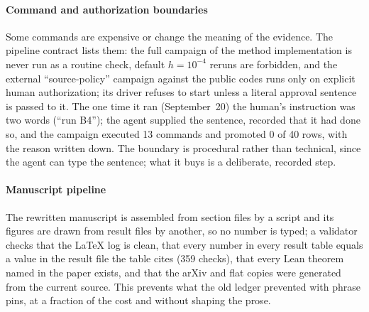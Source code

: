 \paragraph{Command and authorization boundaries}
Some commands are expensive or change the meaning of the evidence. The pipeline contract lists
them: the full campaign of the method implementation is never run as a routine check, default
$h=10^{-4}$ reruns are forbidden, and the external ``source-policy'' campaign against the public
codes runs only on explicit human authorization; its driver refuses to start unless a literal
approval sentence is passed to it. The one time it ran (September~20) the human's instruction was
two words (``run B4''); the agent supplied the sentence, recorded that it had done so, and the
campaign executed 13 commands and promoted 0 of 40 rows, with the reason written down. The
boundary is procedural rather than technical, since the agent can type the sentence; what it buys
is a deliberate, recorded step.

\paragraph{Manuscript pipeline}
\label{sec:manuscript}
The rewritten manuscript is assembled from section files by a script and its figures are drawn
from result files by another, so no number is typed; a validator checks that the LaTeX log is
clean, that every number in every result table equals a value in the result file the table cites
(359 checks), that every Lean theorem named in the paper exists, and that the arXiv and flat copies
were generated from the current source. This prevents what the old ledger prevented with phrase
pins, at a fraction of the cost and without shaping the prose.
